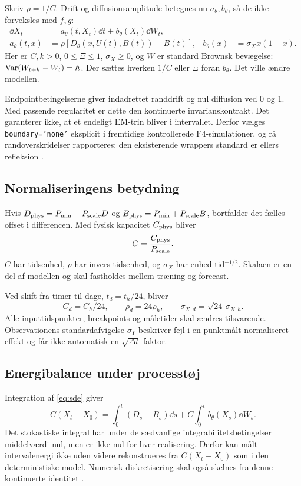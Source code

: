 Skriv \(\rho=1/C\). Drift og diffusionsamplitude betegnes nu \(a_\theta,b_\theta\), så de ikke forveksles med \(f,g\):
\begin{align}
 \dd X_t &= a_\theta(t,X_t)\dd t+b_\theta(X_t)\dd W_t,
 \label{eq:sde}\\
 a_\theta(t,x)&=\rho[D_\theta(x,U(t),B(t))-B(t)],
 &b_\theta(x)&=\sigma_Xx(1-x).
 \label{eq:coefficients}
\end{align}
Her er \(C,k>0\), \(0\leq\Xi\leq1\), \(\sigma_X\geq0\), og \(W\) er standard Brownsk bevægelse: \(\operatorname{Var}(W_{t+h}-W_t)=h\). Der sættes hverken \(1/C\) eller \(\Xi\) foran \(b_\theta\). Det ville ændre modellen.

Endpointbetingelserne giver indadrettet randdrift og nul diffusion ved 0 og 1. Med passende regularitet er dette den kontinuerte invarianskontrakt. Det garanterer ikke, at et endeligt EM-trin bliver i intervallet. Derfor vælges \texttt{boundary='none'} eksplicit i fremtidige kontrollerede F4-simulationer, og rå randoverskridelser rapporteres; den eksisterende wrappers standard er ellers refleksion \cite{repo}.

\subsection{Normaliseringens betydning}
Hvis \(D_{\rm phys}=P_{\min}+P_{\rm scale}D\) og \(B_{\rm phys}=P_{\min}+P_{\rm scale}B\), bortfalder det fælles offset i differencen. Med fysisk kapacitet \(C_{\rm phys}\) bliver
\begin{equation}
 C=\frac{C_{\rm phys}}{P_{\rm scale}}.
 \label{eq:capacity_units}
\end{equation}
\(C\) har tidsenhed, \(\rho\) har invers tidsenhed, og \(\sigma_X\) har enhed tid\(^{-1/2}\). Skalaen er en del af modellen og skal fastholdes mellem træning og forecast.

Ved skift fra timer til dage, \(t_d=t_h/24\), bliver
\begin{equation}
 C_d=C_h/24,\qquad \rho_d=24\rho_h,\qquad
 \sigma_{X,d}=\sqrt{24}\,\sigma_{X,h}.
 \label{eq:time_units}
\end{equation}
Alle inputtidspunkter, breakpoints og måletider skal ændres tilsvarende. Observationens standardafvigelse \(\sigma_Y\) beskriver fejl i en punktmålt normaliseret effekt og får ikke automatisk en \(\sqrt{\Delta t}\)-faktor.

\subsection{Energibalance under processtøj}
Integration af \eqref{eq:sde} giver
\begin{equation}
 C(X_t-X_0)=\int_0^t(D_s-B_s)\dd s
        +C\int_0^t b_\theta(X_s)\dd W_s.
 \label{eq:energy}
\end{equation}
Det stokastiske integral har under de sædvanlige integrabilitetsbetingelser middelværdi nul, men er ikke nul for hver realisering. Derfor kan målt intervalenergi ikke uden videre rekonstrueres fra \(C(X_t-X_0)\) som i den deterministiske model. Numerisk diskretisering skal også skelnes fra denne kontinuerte identitet \cite{higham,repo}.

